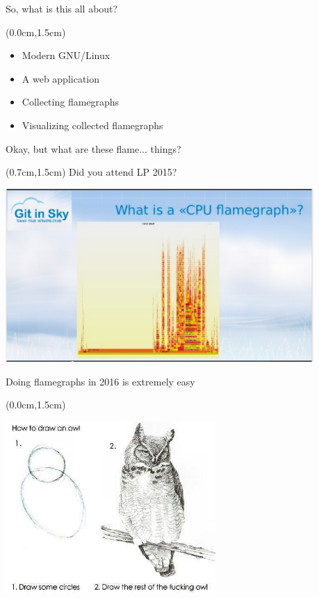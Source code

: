 \documentclass[xetex,14pt,aspectratio=169]{beamer}
\begin{document}
\begin{frame}{So, what is this all about?}
\begin{textblock*}{\framewidth-0.8cm}(0.0cm,1.5cm) %
\begin{itemize}
  \item Modern GNU/Linux
  \item A web application
  \item Collecting flamegraphs
  \item Visualizing collected flamegraphs
\end{itemize}
\end{textblock*}
\end{frame}

\begin{frame}{Okay, but what are these flame... things?}
\begin{textblock*}{\framewidth-0.8cm}(0.7cm,1.5cm) %
Did you attend LP 2015?
\begin{minipage}{\textwidth}
  \centering
  \includegraphics[height=6.6cm]{img/2015-fg.png}
\end{minipage}
\end{textblock*}
\end{frame}

\begin{frame}{Doing flamegraphs in 2016 is extremely easy}
\begin{textblock*}{\framewidth-0.8cm}(0.0cm,1.5cm) %
\begin{minipage}{\textwidth}
  \centering
  \includegraphics[width=8cm]{img/owl}
\end{minipage}
\end{textblock*}
\end{frame}
\end{document}
